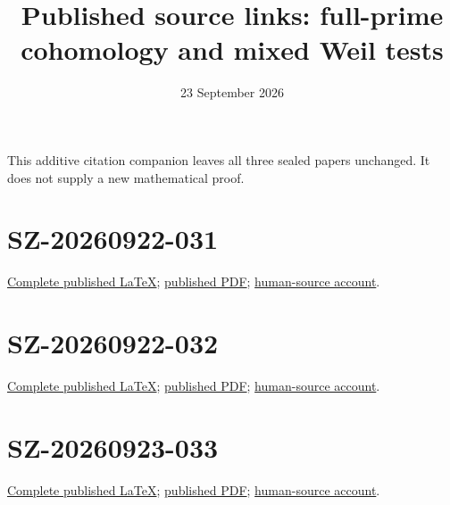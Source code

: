 \documentclass{article}
\title{Published source links: full-prime cohomology and mixed Weil tests}
\author{}
\date{23 September 2026}
\begin{document}
\maketitle
This additive citation companion leaves all three sealed papers unchanged. It does not supply a new mathematical proof.
\section*{SZ-20260922-031}
\href{https://github.com/KokunoYumeto/zeta-function-research-reader/blob/3c78cfbd9e194d35117b33277c421c6564ce3dbf/workbenches/splitzero-tandem/continuations/20260923-full-prime-support/031/01_REBUILT_MATHEMATICS.tex}{Complete published LaTeX}; \href{https://github.com/KokunoYumeto/zeta-function-research-reader/blob/3c78cfbd9e194d35117b33277c421c6564ce3dbf/workbenches/splitzero-tandem/continuations/20260923-full-prime-support/031/02_REBUILT_MATHEMATICS.pdf}{published PDF}; \href{https://github.com/KokunoYumeto/zeta-function-research-reader/blob/3c78cfbd9e194d35117b33277c421c6564ce3dbf/workbenches/splitzero-tandem/continuations/20260923-full-prime-support/031/05_SOURCE_READING_LEDGER.json}{human-source account}.
\section*{SZ-20260922-032}
\href{https://github.com/KokunoYumeto/zeta-function-research-reader/blob/3c78cfbd9e194d35117b33277c421c6564ce3dbf/workbenches/splitzero-tandem/continuations/20260923-full-prime-support/032/RECOVERED_PROGRAMME.tex}{Complete published LaTeX}; \href{https://github.com/KokunoYumeto/zeta-function-research-reader/blob/3c78cfbd9e194d35117b33277c421c6564ce3dbf/workbenches/splitzero-tandem/continuations/20260923-full-prime-support/032/RECOVERED_PROGRAMME.pdf}{published PDF}; \href{https://github.com/KokunoYumeto/zeta-function-research-reader/blob/3c78cfbd9e194d35117b33277c421c6564ce3dbf/workbenches/splitzero-tandem/continuations/20260923-full-prime-support/032/HUMAN_SOURCES.md}{human-source account}.
\section*{SZ-20260923-033}
\href{https://github.com/KokunoYumeto/zeta-function-research-reader/blob/3c78cfbd9e194d35117b33277c421c6564ce3dbf/workbenches/splitzero-tandem/continuations/20260923-full-prime-support/033/MIXED_PRIME_ENERGY_AND_BOUNDARY.tex}{Complete published LaTeX}; \href{https://github.com/KokunoYumeto/zeta-function-research-reader/blob/3c78cfbd9e194d35117b33277c421c6564ce3dbf/workbenches/splitzero-tandem/continuations/20260923-full-prime-support/033/MIXED_PRIME_ENERGY_AND_BOUNDARY.pdf}{published PDF}; \href{https://github.com/KokunoYumeto/zeta-function-research-reader/blob/3c78cfbd9e194d35117b33277c421c6564ce3dbf/workbenches/splitzero-tandem/continuations/20260923-full-prime-support/033/HUMAN_SOURCES.md}{human-source account}.
\end{document}
